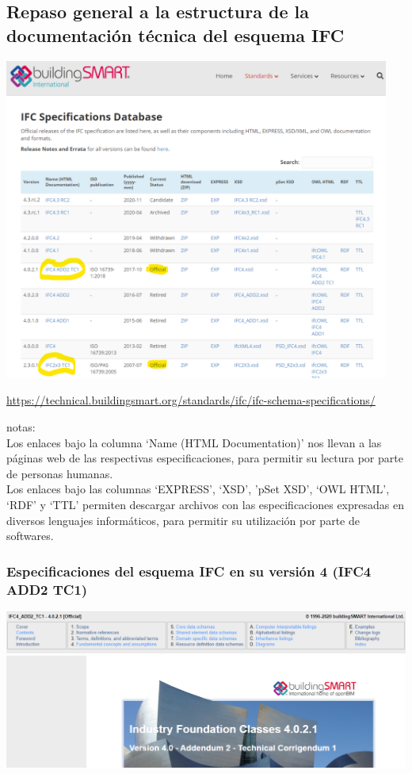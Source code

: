 \documentclass[spanish,10pt,a4paper,final,oneside]{article}
\begin{document}
\subsection{Repaso general a la estructura de la documentación técnica del esquema IFC}

\includegraphics[width=0.95\textwidth]{web - IFC SpecificationsDatabase}

\url{https://technical.buildingsmart.org/standards/ifc/ifc-schema-specifications/}

notas: 
\\Los enlaces bajo la columna `Name (HTML Documentation)' nos llevan a las páginas web de las respectivas especificaciones, para permitir su lectura por parte de personas humanas.
\\Los enlaces bajo las columnas `EXPRESS', `XSD', 'pSet XSD', `OWL HTML', `RDF' y `TTL' permiten descargar archivos con las especificaciones expresadas en diversos lenguajes informáticos, para permitir su utilización por parte de softwares.


\subsubsection{Especificaciones del esquema IFC en su versión 4 (IFC4 ADD2 TC1)}

\includegraphics[width=\textwidth]{IFC4 - Portada}
\end{document}
